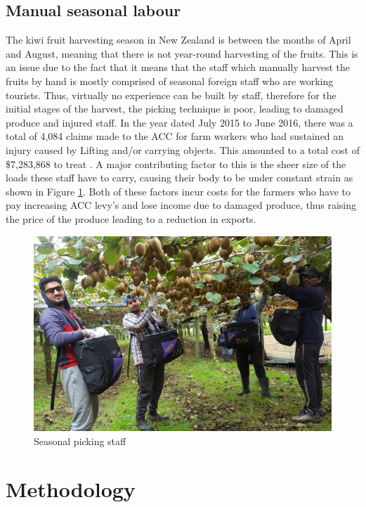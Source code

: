 \documentclass[11pt,twocolumn]{article}
\begin{document}
\subsection{Manual seasonal labour}
The kiwi fruit harvesting season in New Zealand is between the months of April and August, meaning that there is not year-round harvesting of the fruits. This is an issue due to the fact that it means that the staff which manually harvest the fruits by hand is mostly comprised of seasonal foreign staff who are working tourists. Thus, virtually no experience can be built by staff, therefore for the initial stages of the harvest, the picking technique is poor, leading to damaged produce and injured staff. In the year dated July 2015 to June 2016, there was a total of 4,084 claims made to the ACC for farm workers who had sustained an injury caused by Lifting and/or carrying objects. This amounted to a total cost of \$7,283,868 to treat \cite{injury_statistics_tool_2017}. A major contributing factor to this is the sheer size of the loads these staff have to carry, causing their body to be under constant strain as shown in Figure \ref{fig:Picking}.  Both of these factors incur costs for the farmers who have to pay increasing ACC levy's and lose income due to damaged produce, thus raising the price of the produce leading to a reduction in exports.
\begin{figure}[h]
\centering
\includegraphics[scale=0.2]{Pickers}
\caption{Seasonal picking staff}
\label{fig:Picking}
\end{figure}

\section{Methodology}
\end{document}
